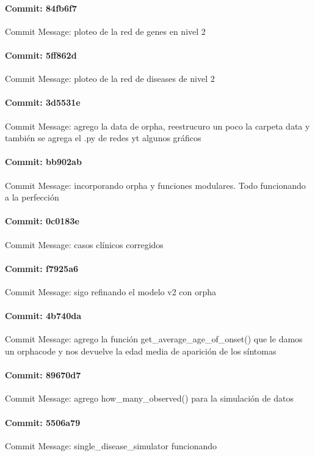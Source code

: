 \documentclass{article}
\begin{document}
\paragraph{Commit: 84fb6f7}
Commit Message: ploteo de la red de genes en nivel 2

\paragraph{Commit: 5ff862d}
Commit Message: ploteo de la red de diseases de nivel 2

\paragraph{Commit: 3d5531e}
Commit Message: agrego la data de orpha, reestrucuro un poco la carpeta data y también se agrega el .py de redes yt algunos gráficos

\paragraph{Commit: bb902ab}
Commit Message: incorporando orpha y funciones modulares. Todo funcionando a la perfección

\paragraph{Commit: 0c0183e}
Commit Message: casos clínicos corregidos

\paragraph{Commit: f7925a6}
Commit Message: sigo refinando el modelo v2 con orpha

\paragraph{Commit: 4b740da}
Commit Message: agrego la función get_average_age_of_onset() que le damos un orphacode y nos devuelve la edad media de aparición de los síntomas

\paragraph{Commit: 89670d7}
Commit Message: agrego how_many_observed() para la simulación de datos

\paragraph{Commit: 5506a79}
Commit Message: single_disease_simulator funcionando
\end{document}
